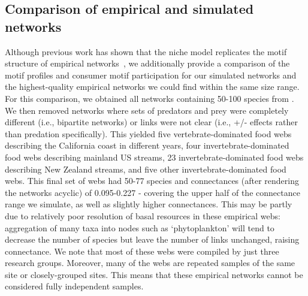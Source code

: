 \documentclass[12pt]{article}
\begin{document}
\begin{spacing}{2.0}
    \subsection{Comparison of empirical and simulated networks}
    
        Although previous work has shown that the niche model replicates the motif structure of empirical networks~\citep{Stouffer2005a,Stouffer2006}, we additionally provide a comparison of the motif profiles and consumer motif participation for our simulated networks and the highest-quality empirical networks we could find within the same size range.
        For this comparison, we obtained all networks containing 50-100 species from \citet{globalwebdb}.
        We then removed networks where sets of predators and prey were completely different (i.e., bipartite networks) or links were not clear (i.e., +/- effects rather than predation specifically).
        This yielded five vertebrate-dominated food webs describing the California coast in different years, four invertebrate-dominated food webs describing mainland US streams, 23 invertebrate-dominated food webs describing New Zealand streams, and five other invertebrate-dominated food webs.
        This final set of webs had 50-77 species and connectances (after rendering the networks acyclic) of 0.095-0.227 - covering the upper half of the connectance range we simulate, as well as slightly higher connectances.
        This may be partly due to relatively poor resolution of basal resources in these empirical webs: aggregation of many taxa into nodes such as `phytoplankton' will tend to decrease the number of species but leave the number of links unchanged, raising connectance.
        We note that most of these webs were compiled by just three research groups.
        Moreover, many of the webs are repeated samples of the same site  or closely-grouped sites.
        This means that these empirical networks cannot be considered fully independent samples.
        

\end{spacing}
\end{document}
